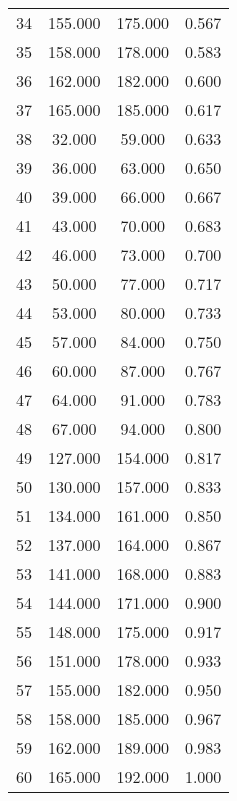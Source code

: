 \begin{tabular}{cccc}
  34 & 155.000 & 175.000 & 0.567 \\ 
  35 & 158.000 & 178.000 & 0.583 \\ 
  36 & 162.000 & 182.000 & 0.600 \\ 
  37 & 165.000 & 185.000 & 0.617 \\ 
  38 & 32.000 & 59.000 & 0.633 \\ 
  39 & 36.000 & 63.000 & 0.650 \\ 
  40 & 39.000 & 66.000 & 0.667 \\ 
  41 & 43.000 & 70.000 & 0.683 \\ 
  42 & 46.000 & 73.000 & 0.700 \\ 
  43 & 50.000 & 77.000 & 0.717 \\ 
  44 & 53.000 & 80.000 & 0.733 \\ 
  45 & 57.000 & 84.000 & 0.750 \\ 
  46 & 60.000 & 87.000 & 0.767 \\ 
  47 & 64.000 & 91.000 & 0.783 \\ 
  48 & 67.000 & 94.000 & 0.800 \\ 
  49 & 127.000 & 154.000 & 0.817 \\ 
  50 & 130.000 & 157.000 & 0.833 \\ 
  51 & 134.000 & 161.000 & 0.850 \\ 
  52 & 137.000 & 164.000 & 0.867 \\ 
  53 & 141.000 & 168.000 & 0.883 \\ 
  54 & 144.000 & 171.000 & 0.900 \\ 
  55 & 148.000 & 175.000 & 0.917 \\ 
  56 & 151.000 & 178.000 & 0.933 \\ 
  57 & 155.000 & 182.000 & 0.950 \\ 
  58 & 158.000 & 185.000 & 0.967 \\ 
  59 & 162.000 & 189.000 & 0.983 \\ 
  60 & 165.000 & 192.000 & 1.000 \\ 
   \hline
\end{tabular}
